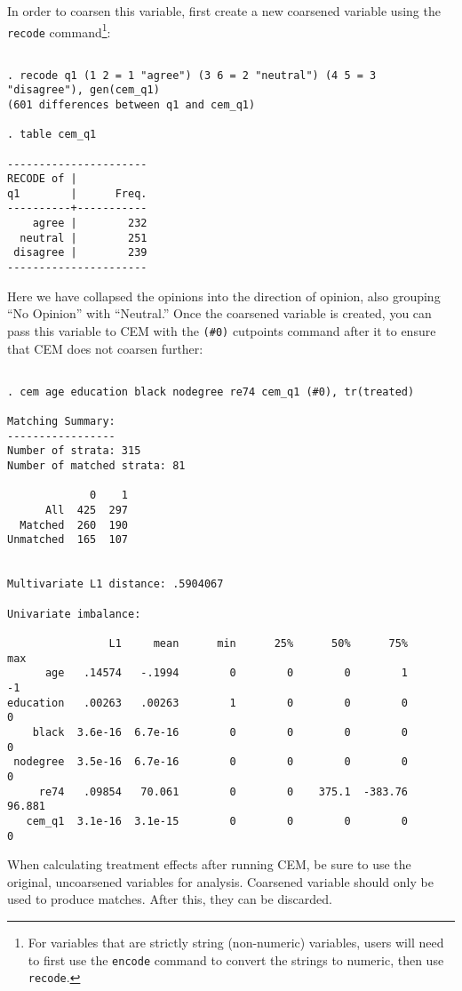 \documentclass[11pt]{article}
\begin{document}
In order to coarsen this variable, first create a new coarsened variable
using the \texttt{recode} command\footnote{For variables that are strictly
  string (non-numeric) variables, users will need to first use the
  \texttt{encode} command to convert the strings to numeric, then use
  \texttt{recode}.}:
\begin{verbatim}

. recode q1 (1 2 = 1 "agree") (3 6 = 2 "neutral") (4 5 = 3 "disagree"), gen(cem_q1)
(601 differences between q1 and cem_q1)

. table cem_q1

----------------------
RECODE of |
q1        |      Freq.
----------+-----------
    agree |        232
  neutral |        251
 disagree |        239
----------------------

\end{verbatim}

Here we have collapsed the opinions into the direction of opinion, also
grouping ``No Opinion'' with ``Neutral.''  Once the coarsened variable is
created, you can pass this variable to CEM with the \texttt{(\#0)}
cutpoints command after it to ensure that CEM does not coarsen further:

\begin{verbatim}

. cem age education black nodegree re74 cem_q1 (#0), tr(treated)

Matching Summary:
-----------------
Number of strata: 315
Number of matched strata: 81

             0    1
      All  425  297
  Matched  260  190
Unmatched  165  107


Multivariate L1 distance: .5904067

Univariate imbalance:

                L1     mean      min      25%      50%      75%      max
      age   .14574   -.1994        0        0        0        1       -1
education   .00263   .00263        1        0        0        0        0
    black  3.6e-16  6.7e-16        0        0        0        0        0
 nodegree  3.5e-16  6.7e-16        0        0        0        0        0
     re74   .09854   70.061        0        0    375.1  -383.76   96.881
   cem_q1  3.1e-16  3.1e-15        0        0        0        0        0

\end{verbatim}

When calculating treatment effects after running CEM, be sure to use the
original, uncoarsened variables for analysis. Coarsened variable should
only be used to produce matches. After this, they can be discarded. 
\end{document}
